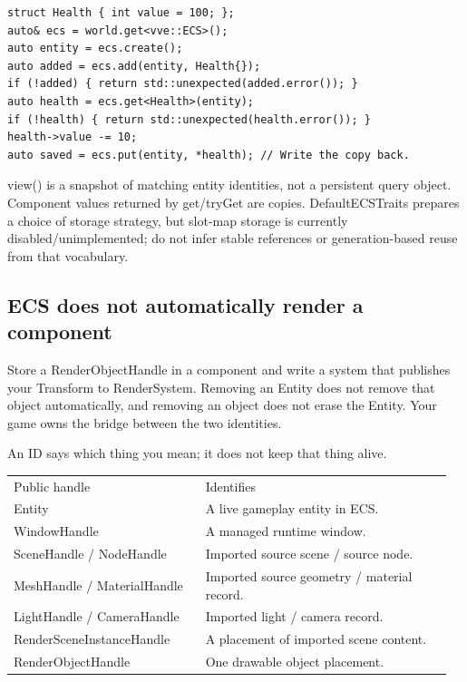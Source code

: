 \documentclass[11pt,a4paper]{article}
\begin{document}
\begin{lstlisting}[language={}]
struct Health { int value = 100; };
auto& ecs = world.get<vve::ECS>();
auto entity = ecs.create();
auto added = ecs.add(entity, Health{});
if (!added) { return std::unexpected(added.error()); }
auto health = ecs.get<Health>(entity);
if (!health) { return std::unexpected(health.error()); }
health->value -= 10;
auto saved = ecs.put(entity, *health); // Write the copy back.
\end{lstlisting}

view() is a snapshot of matching entity identities, not a persistent query object. Component values returned by get/tryGet are copies. DefaultECSTraits prepares a choice of storage strategy, but slot-map storage is currently disabled/unimplemented; do not infer stable references or generation-based reuse from that vocabulary.

\subsection*{ECS does not automatically render a component}
Store a RenderObjectHandle in a component and write a system that publishes your Transform to RenderSystem. Removing an Entity does not remove that object automatically, and removing an object does not erase the Entity. Your game owns the bridge between the two identities.

\label{core-20}
An ID says which thing you mean; it does not keep that thing alive.

{\small
\begin{longtable}{@{}p{0.42\linewidth}p{0.54\linewidth}@{}}
Public handle & Identifies \\
Entity & A live gameplay entity in ECS. \\
WindowHandle & A managed runtime window. \\
SceneHandle / NodeHandle & Imported source scene / source node. \\
MeshHandle / MaterialHandle & Imported source geometry / material record. \\
LightHandle / CameraHandle & Imported light / camera record. \\
RenderSceneInstanceHandle & A placement of imported scene content. \\
RenderObjectHandle & One drawable object placement. \\
\end{longtable}
}
\end{document}
